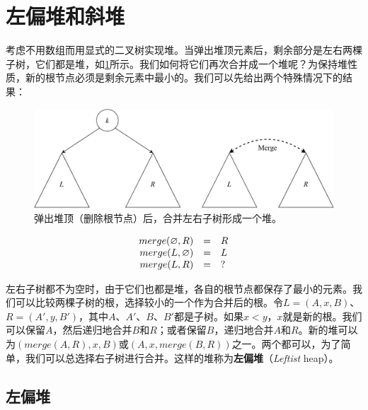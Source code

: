 \documentclass[b5paper]{ctexart}
\begin{document}
\begin{Answer}[ref = {ex:arrayed-binary-heap}]

\end{Answer}

\section{左偏堆和斜堆}
\label{ebheap}

考虑不用数组而用显式的二叉树实现堆。当弹出堆顶元素后，剩余部分是左右两棵子树，它们都是堆，如\cref{fig:lvr}所示。我们如何将它们再次合并成一个堆呢？为保持堆性质，新的根节点必须是剩余元素中最小的。我们可以先给出两个特殊情况下的结果：

\begin{figure}[htbp]
  \centering
  \includegraphics[scale=0.5]{img/lkr}
  \caption{弹出堆顶（删除根节点）后，合并左右子树形成一个堆。}
  \label{fig:lvr}
\end{figure}

\[
\begin{array}{rcl}
merge(\varnothing, R) & = & R \\
merge(L, \varnothing) & = & L \\
merge(L, R) & = & ? \\
\end{array}
\]

左右子树都不为空时，由于它们也都是堆，各自的根节点都保存了最小的元素。我们可以比较两棵子树的根，选择较小的一个作为合并后的根。令$L = (A, x, B)$、$R = (A', y, B')$，其中$A$、$A'$、$B$、$B'$都是子树。如果$x < y$，$x$就是新的根。我们可以保留$A$，然后递归地合并$B$和$R$；或者保留$B$，递归地合并$A$和$R$。新的堆可以为$(merge(A, R), x, B)$或$(A, x, merge(B, R))$之一。两个都可以，为了简单，我们可以总选择右子树进行合并。这样的堆称为\textbf{左偏堆}（{\em Leftist} heap）。

\subsection{左偏堆}
  
\end{document}
